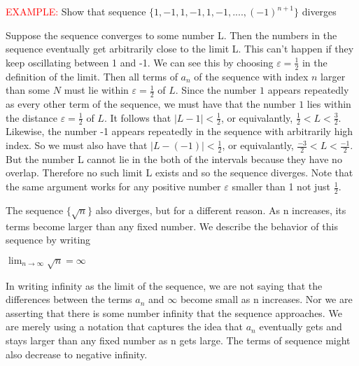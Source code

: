 \documentclass[12pt,a4paper]{article}
\newcommand{\example}{\vspace{1\baselineskip}\par\noindent\textcolor{red}{EXAMPLE: }}
\begin{document}
\smallskip

\example Show that sequence $\{1, -1, 1, -1, 1, -1, ...., (-1)^{n+1}\}$ diverges



\begin{center}
    
\end{center}

\noindent Suppose the sequence converges to some number L. Then the numbers in the sequence eventually get arbitrarily close to the limit L. This can't happen if they keep oscillating between 1 and -1. We can see this by choosing $\varepsilon=\frac{1}{2}$ in the definition of the limit. 
Then all terms of $a_n$ of the sequence with index $n$ larger than some $N$ must lie within $\varepsilon=\frac{1}{2}$ of $L$. Since the number $1$ appears repeatedly as every other term of the sequence, we must have that the number $1$ lies within the distance $\varepsilon=\frac{1}{2}$ of $L$. It follows that $|L - 1| < \frac{1}{2}$,
or equivalantly, $\frac{1}{2}<L<\frac{3}{2}$. Likewise, the number -1 appears repeatedly in the sequence with arbitrarily high index. So we must also have that $|L - (-1)|<\frac{1}{2}$, or equivalantly, $\frac{-3}{2}<L<\frac{-1}{2}$. But the number L cannot lie in the both of the intervals because they have no overlap. Therefore no such limit L exists and so the sequence diverges.
Note that the same argument works for any positive number $\varepsilon$ smaller than 1 not just $\frac{1}{2}$.


\newpage
The sequence $\{\sqrt{n}\}$ also diverges, but for a different reason. As n increases, its terms become larger than any fixed number. We describe the behavior of this sequence by writing
\begin{center}
    $\lim_{n \to \infty}\sqrt{n}=\infty$
\end{center}
In writing infinity as the limit of the sequence, we are not saying that the differences between the terms $a_n$ and $\infty$ become small as n increases. Nor we are asserting that there is some number infinity that the sequence approaches. We are merely using a notation that captures the idea that $a_n$ eventually gets and stays larger than any fixed number as n gets large. The terms of sequence might also decrease to negative infinity. 
\end{document}
